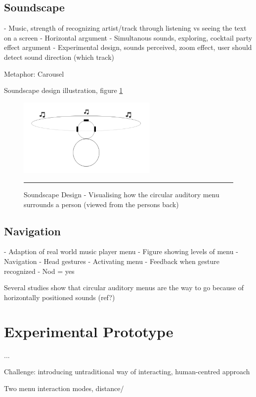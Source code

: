 \subsection{Soundscape}
- Music, strength of recognizing artist/track through listening vs seeing the text on a screen
- Horizontal argument
- Simultanous sounds, exploring, cocktail party effect argument
- Experimental design, sounds perceived, zoom effect, user should detect sound direction (which track)

Metaphor: Carousel

Soundscape design illustration, figure \ref{fig:sounddesign}

\begin{figure}[htbp]
	\centering
		\includegraphics[width=0.6\textwidth,height=\textheight,keepaspectratio]{./Figures/sounddesign.png}
		\rule{35em}{0.5pt}
	\caption[Soundscape Design]{Soundscape Design - Visualising how the circular auditory menu surrounds a person (viewed from the persons back)}
	\label{fig:sounddesign}
\end{figure}

\subsection{Navigation}
- Adaption of real world music player menu
- Figure showing levels of menu
- Navigation
- Head gestures
- Activating menu
- Feedback when gesture recognized
- Nod = yes

Several studies show that circular auditory menus are the way to go because of horizontally positioned sounds (ref?)


\section{Experimental Prototype}
...

Challenge: introducing untraditional way of interacting, human-centred approach

Two menu interaction modes, distance/



























